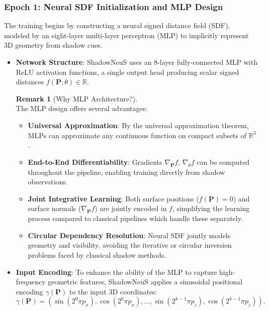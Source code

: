 \documentclass[12pt,a4paper]{article}
\theoremstyle{definition}
\newtheorem{remark}{Remark}[subsection]
\begin{document}
\subsubsection{Epoch 1: Neural SDF Initialization and MLP Design} \label{sec:epoch1_neural_sdf}

The training begins by constructing a neural signed distance field (SDF), modeled by an eight-layer multi-layer perceptron (MLP) to implicitly represent 3D geometry from shadow cues. 

\begin{itemize}

    \item \textbf{Network Structure}: ShadowNeuS uses an 8-layer fully-connected MLP with ReLU activation functions, a single output head producing scalar signed distances $f(\mathbf{P}; \theta) \in \mathbb{R}$.

    \begin{remark}[Why MLP Architecture?] ~\\
    The MLP design offers several advantages:
    \begin{itemize}
        \item \textbf{Universal Approximation}: By the universal approximation theorem, MLPs can approximate any continuous function on compact subsets of $\mathbb{R}^3$.
        \item \textbf{End-to-End Differentiability}: Gradients $\nabla_{\mathbf{P}} f$, $\nabla_{\theta} f$ can be computed throughout the pipeline, enabling training directly from shadow observations.
        \item \textbf{Joint Integrative Learning}: Both surface positions ($f(\mathbf{P}) = 0$) and surface normals ($\nabla_{\mathbf{P}} f$) are jointly encoded in $f$, simplifying the learning process compared to classical pipelines which handle these separately.
        \item \textbf{Circular Dependency Resolution}: Neural SDF jointly models geometry and visibility, avoiding the iterative or circular inversion problems faced by classical shadow methods.
    \end{itemize}
    \end{remark}

    \item \textbf{Input Encoding}: To enhance the ability of the MLP to capture high-frequency geometric features, ShadowNeuS applies a sinusoidal positional encoding $\gamma(\mathbf{P})$ to the input 3D coordinates:
    \begin{equation}
    \gamma(\mathbf{P}) = \left( \sin(2^0 \pi p_x), \cos(2^0 \pi p_x), \ldots, \sin(2^{k-1} \pi p_z), \cos(2^{k-1} \pi p_z) \right).
    \end{equation}


\end{itemize}
\end{document}
